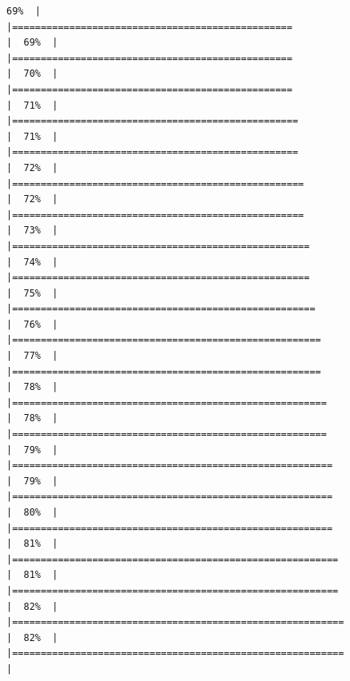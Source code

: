 \documentclass[
  english,
  man,a4paper,mask,floatsintext]{apa6}
\begin{document}
\begin{verbatim}
69%  |                                                                              |=================================================                     |  69%  |                                                                              |=================================================                     |  70%  |                                                                              |=================================================                     |  71%  |                                                                              |==================================================                    |  71%  |                                                                              |==================================================                    |  72%  |                                                                              |===================================================                   |  72%  |                                                                              |===================================================                   |  73%  |                                                                              |====================================================                  |  74%  |                                                                              |====================================================                  |  75%  |                                                                              |=====================================================                 |  76%  |                                                                              |======================================================                |  77%  |                                                                              |======================================================                |  78%  |                                                                              |=======================================================               |  78%  |                                                                              |=======================================================               |  79%  |                                                                              |========================================================              |  79%  |                                                                              |========================================================              |  80%  |                                                                              |========================================================              |  81%  |                                                                              |=========================================================             |  81%  |                                                                              |=========================================================             |  82%  |                                                                              |==========================================================            |  82%  |                                                                              |==========================================================            |  
\end{verbatim}
\end{document}
